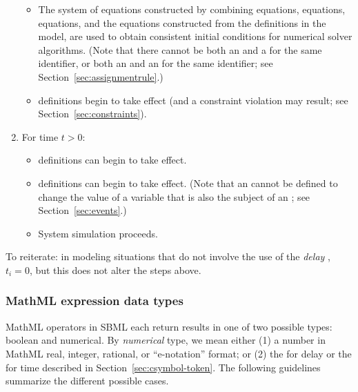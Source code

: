 \begin{enumerate}
\begin{itemize}
  \item The system of equations constructed by combining
    \AssignmentRule equations, \AlgebraicRule equations, \RateRule
    equations, and the equations constructed from the \Reaction
    definitions in the model, are used to obtain consistent
    initial conditions for numerical solver algorithms.  (Note
    that there cannot be both an \AssignmentRule and a \RateRule
    for the same identifier, or both an \AssignmentRule and an
    \InitialAssignment for the same identifier; see
    Section~\ref{sec:assignmentrule}.)
    
  \item \Constraint definitions begin to take effect (and a
    constraint violation may result; see
    Section~\ref{sec:constraints}).

  \end{itemize}
  
\item For time $t > 0$:
  \begin{itemize}
    
  \item \RateRule definitions can begin to take effect.
    
  \item \Event definitions can begin to take effect.  (Note that
    an \Event cannot be defined to change the value of a variable
    that is also the subject of an \AssignmentRule; see
    Section~\ref{sec:events}.)

  \item System simulation proceeds.

  \end{itemize}

\end{enumerate}  

To reiterate: in modeling situations that do not involve the use
of the \emph{delay} , $t_i = 0$, but this does not
alter the steps above.


\subsubsection{MathML expression data types}
\label{sec:mathmltype}

MathML operators in SBML each return results in one of two
possible types: boolean and numerical.  By
\emph{numerical} type, we mean either (1) a number in
  MathML real, integer, rational, or ``e-notation'' format;
or (2) the  for delay or the
   for time described in
  Section~\ref{sec:csymbol-token}.  The following guidelines
summarize the different possible cases.

